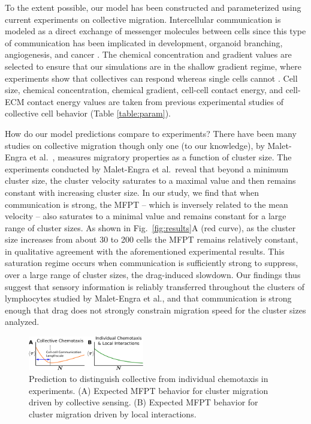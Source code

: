 To the extent possible, our model has been constructed and parameterized using current experiments on collective migration. Intercellular communication is modeled as a direct exchange of messenger molecules between cells since this type of  communication has been implicated in development, organoid branching, angiogenesis, and cancer \cite{ramel2013rab11,ellison2016cell,gerhardt2003vegf,hsu2000cadherin,friedl2009collective}. The chemical concentration and gradient values are selected to ensure that our simulations are in the shallow gradient regime, where experiments show that collectives can respond whereas single cells cannot \cite{ellison2016cell,malet2015collective,rosoff2004new}. Cell size, chemical concentration, chemical gradient, cell-cell contact energy, and cell-ECM contact energy values are taken from previous experimental studies of collective cell behavior (Table \ref{table:param}).

How do our model predictions compare to experiments? There have been many studies on collective migration \cite{cheung2013collective,puliafito2015three,defranco2008migrating,ramel2013rab11} though only one (to our knowledge), by Malet-Engra et al.\ \cite{malet2015collective}, measures migratory properties as a function of cluster size. The experiments conducted by Malet-Engra et al.\ reveal that beyond a minimum cluster size, the cluster velocity saturates to a maximal value and then remains constant with increasing cluster size. In our study, we find that when communication is strong, the MFPT -- which is inversely related to the mean velocity -- also saturates to a minimal value and remains constant for a large range of cluster sizes. As shown in Fig.\ \ref{fig:results}A (red curve), as the cluster size increases from about 30 to 200 cells the MFPT remains relatively constant, in qualitative agreement with the aforementioned experimental results. This saturation regime occurs when communication is sufficiently strong to suppress, over a large range of cluster sizes, the drag-induced slowdown. Our findings thus suggest that sensory information is reliably transferred throughout the clusters of lymphocytes studied by Malet-Engra et al., and that communication is strong enough that drag does not strongly constrain migration speed for the cluster sizes analyzed.


\begin{figure}[t]
    \centering
        \includegraphics[width=0.45\textwidth]{../fig/ch2_fig4.png}
    \caption{Prediction to distinguish collective from individual chemotaxis in experiments. (A) Expected MFPT behavior for cluster migration driven by collective sensing. (B) Expected MFPT behavior for cluster migration driven by local interactions.} \label{fig:mfpt}
\end{figure}



